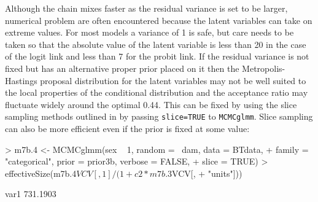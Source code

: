 \documentclass{article}
\begin{document}
Although the chain mixes faster as the residual variance is set to be larger, numerical problem are often encountered because the latent variables can take on extreme values. For most models a variance of 1 is safe, but care needs to be taken so that the absolute value of the latent variable is less than 20 in the case of the logit link and less than 7 for the probit link. If the residual variance is not fixed but has an alternative proper prior placed on it then the Metropolis-Hastings proposal distribution for the latent variables may not be well suited to the local properties of the conditional distribution and the acceptance ratio may fluctuate widely around the optimal 0.44. This can be fixed by using the slice sampling methods outlined in \citet{Damien.1999} by passing \texttt{slice=TRUE} to \texttt{MCMCglmm}. Slice sampling can also be more efficient even if the prior is fixed at some value: 
 
\begin{Schunk}
\begin{Sinput}
> m7b.4 <- MCMCglmm(sex ~ 1, random = ~dam, data = BTdata, 
+     family = "categorical", prior = prior3b, verbose = FALSE, 
+     slice = TRUE)
> effectiveSize(m7b.4$VCV[, 1]/(1 + c2 * m7b.3$VCV[, 
+     "units"]))
\end{Sinput}
\begin{Soutput}
    var1 
731.1903 
\end{Soutput}
\end{Schunk}

\ifalone
\end{document}
